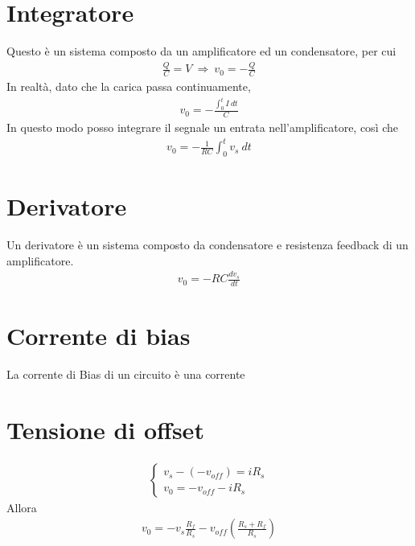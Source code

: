 \documentclass[a4paper, oneside]{article}
\begin{document}
\section{Integratore}
Questo è un sistema composto da un amplificatore ed un condensatore, 
per cui 
\begin{gather*}
    \frac{Q}{C} = V \ \Longrightarrow \ v_0 = - \frac{Q}{C}
\end{gather*}
In realtà, dato che la carica passa continuamente, 
\begin{gather*}
    v_0 = - \frac{\int_{0}^{t} I \ dt }{C}
\end{gather*}
In questo modo posso integrare il segnale un entrata nell'amplificatore, così che
\begin{gather*}
    v_0 = - \frac{1}{RC}\int_{0}^{t} v_s \ dt 
\end{gather*}

\section{Derivatore}
Un derivatore è un sistema composto da condensatore e resistenza feedback di un 
amplificatore. 
\begin{gather*}
    v_0 = -RC\frac{dv_s}{dt}
\end{gather*} 


\section{Corrente di bias}
La corrente di Bias di un circuito è una corrente 


\section{Tensione di offset}
\begin{gather*}
    \left\{\begin{array}{l}
        v_s -(-v_{off}) = iR_s \\
        v_0 = -v_{off}- iR_s
    \end{array}\right.
\end{gather*}
Allora 
\begin{gather*}
    v_0 = - v_s\frac{R_f}{R_s} - v_{off} \left(\frac{R_s + R_f}{R_s}\right)
\end{gather*}
\end{document}
